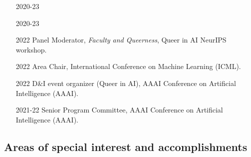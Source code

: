 \documentclass[10pt]{article}
\begin{document}
\begin{itemize}[leftmargin=5em]
  \item[2020-23] 
  \item[2020-23] 
  \item[2022] {Panel Moderator, \emph{Faculty and Queerness}, Queer in AI NeurIPS workshop.}
  \item[2022] {Area Chair, International Conference on Machine Learning (ICML).}
  \item[2022] {D\&I event organizer (Queer in AI), AAAI Conference on Artificial Intelligence (AAAI).}
  \item[2021-22] {Senior Program Committee, AAAI Conference on Artificial Intelligence (AAAI).}
\end{itemize}









\subsection{Areas of special interest and accomplishments}

\end{document}
